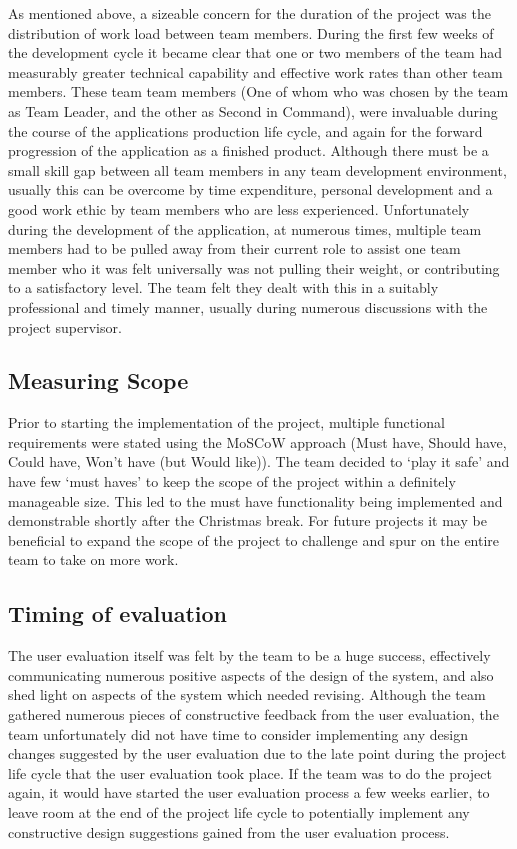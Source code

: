 As mentioned above, a sizeable concern for the duration of the project was the
distribution of work load between team members. During the first few weeks of
the development cycle it became clear that one or two members of the team had
measurably greater technical capability and effective work rates than other
team members. These team team members (One of whom who was chosen by the team
as Team Leader, and the other as Second in Command), were invaluable during  the
course of the applications production life cycle, and again for the  forward
progression of the application as a finished product. Although there  must be a
small skill gap between all team members in any team development  environment,
usually this can be overcome by time expenditure, personal  development and a
good work ethic by team members who are less experienced.  Unfortunately during
the development of the application, at numerous times,  multiple team members
had to be pulled away from their current role to assist  one team member who it
was felt universally was not pulling their weight, or  contributing to a
satisfactory level. The team felt they dealt with this in a  suitably
professional and timely manner, usually during numerous discussions  with the
project supervisor.

\subsection{Measuring Scope}

Prior to starting the implementation of the project, multiple functional
requirements were stated using the MoSCoW approach (Must have, Should have,
Could have, Won't have (but Would like)). The team decided to `play it safe' and
have few `must haves' to keep the scope of the project within a definitely
manageable size. This led to the must have functionality being implemented and
demonstrable shortly after the Christmas break. For future projects it may be
beneficial to expand the scope of the project to challenge and spur on the
entire team to take on more work.

\subsection{Timing of evaluation}

The user evaluation itself was felt by the team to be a huge success,
effectively communicating numerous positive aspects of the design of the system,
and also shed light on aspects of the system which needed revising. Although the
team gathered numerous pieces of constructive feedback from the user evaluation,
the team unfortunately did not have time to consider implementing any design
changes suggested by the user evaluation due to the late point during the
project life cycle that the user evaluation took place. If the team was to do
the project again, it would have started the user evaluation process a few weeks
earlier, to leave room at the end of the project life cycle to potentially
implement any constructive design suggestions gained from the user evaluation
process.
